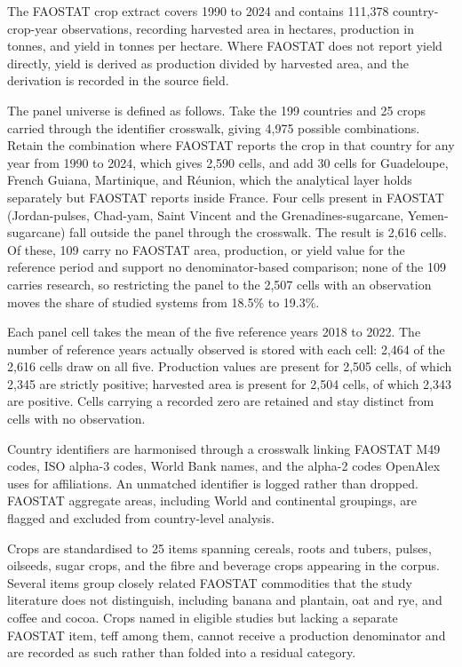 \documentclass[ASNA,twocolumn]{USG}
\makeatletter
\newcommand{\applabel}[2]{\phantomsection\edef\@currentlabel{#1}\label{#2}}
\makeatother
\begin{document}
\applabel{Appendix C}{app:variables}


The FAOSTAT crop extract covers 1990 to 2024 and contains 111,378 country-crop-year
observations, recording harvested area in hectares, production in tonnes, and yield in tonnes
per hectare. Where FAOSTAT does not report yield directly, yield is derived as production
divided by harvested area, and the derivation is recorded in the source field.

The panel universe is defined as follows. Take the 199 countries and 25 crops carried through
the identifier crosswalk, giving 4,975 possible combinations. Retain the combination where
FAOSTAT reports the crop in that country for any year from 1990 to 2024, which gives 2,590 cells,
and add 30 cells for Guadeloupe, French Guiana, Martinique, and R\'eunion, which the analytical
layer holds separately but FAOSTAT reports inside France. Four cells present in FAOSTAT
(Jordan-pulses, Chad-yam, Saint Vincent and the Grenadines-sugarcane, Yemen-sugarcane) fall
outside the panel through the crosswalk. The result is 2,616 cells. Of these, 109 carry no
FAOSTAT area, production, or yield value for the reference period and support no
denominator-based comparison; none of the 109 carries research, so restricting the panel to the
2,507 cells with an observation moves the share of studied systems from 18.5\% to 19.3\%.

Each panel cell takes the mean of the five reference years 2018 to 2022. The number of reference
years actually observed is stored with each cell: 2,464 of the 2,616 cells draw on all five. Production values are present for 2,505 cells, of which 2,345 are strictly
positive; harvested area is present for 2,504 cells, of which 2,343 are positive. Cells
carrying a recorded zero are retained and stay distinct from cells with no observation.

Country identifiers are harmonised through a crosswalk linking FAOSTAT M49 codes, ISO
alpha-3 codes, World Bank names, and the alpha-2 codes OpenAlex uses for affiliations. An
unmatched identifier is logged rather than dropped. FAOSTAT aggregate areas, including World
and continental groupings, are flagged and excluded from country-level analysis.

Crops are standardised to 25 items spanning cereals, roots and tubers, pulses, oilseeds,
sugar crops, and the fibre and beverage crops appearing in the corpus. Several items group
closely related FAOSTAT commodities that the study literature does not distinguish, including
banana and plantain, oat and rye, and coffee and cocoa. Crops named in eligible studies but
lacking a separate FAOSTAT item, teff among them, cannot receive a production denominator and
are recorded as such rather than folded into a residual category.
\end{document}
